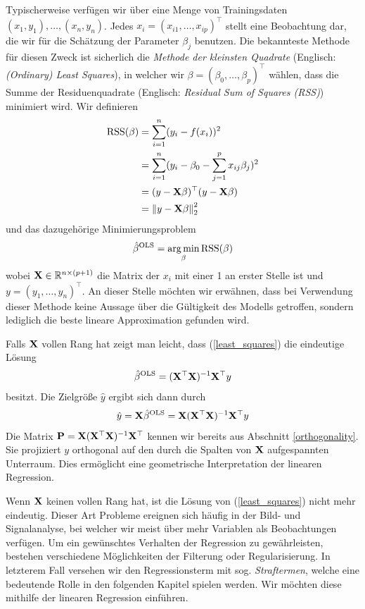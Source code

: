 Typischerweise verfügen wir über eine Menge von Trainingsdaten $(x_1, y_1), \ldots, (x_n, y_n)$. Jedes $x_i = (x_{i1}, \ldots, x_{ip})^{\top}$ stellt eine Beobachtung dar, die wir für die Schätzung der Parameter $\beta_j$ benutzen. Die bekannteste Methode für diesen Zweck ist sicherlich die \textit{Methode der kleinsten Quadrate} (Englisch: \textit{(Ordinary) Least Squares}), in welcher wir $\beta = (\beta_0, \ldots, \beta_p)^{\top}$ wählen, dass die Summe der Residuenquadrate (Englisch: \textit{Residual Sum of Squares (RSS)}) minimiert wird. Wir definieren
\begin{align}
\label{RSS}
\text{RSS}(\beta) & = \sum_{i=1}^{n}(y_i - f(x_i))^2\\
& = \sum_{i=1}^{n}(y_i - \beta_0 - \sum_{j=1}^p x_{ij}\beta_j)^2\nonumber\\
& = (y - \mathbf{X} \beta)^{\top}(y-\mathbf{X} \beta)\nonumber\\
& = \left\lVert y - \mathbf{X} \beta \right\rVert_{2}^{2}\nonumber
\end{align}
und das dazugehörige Minimierungsproblem
\begin{align}
\label{least_squares}
\hat{\beta}^{\text{OLS}} = \operatorname*{arg\,min}_{\beta} \text{RSS}(\beta)
\end{align}
wobei $\mathbf{X} \in \mathbb{R}^{n \times (p+1)}$ die Matrix der $x_i$ mit einer 1 an erster Stelle ist und $y = (y_1, \ldots, y_n)^{\top}$. An dieser Stelle möchten wir erwähnen, dass bei Verwendung dieser Methode keine Aussage über die Gültigkeit des Modells getroffen, sondern lediglich die beste lineare Approximation gefunden wird.

Falls $\mathbf{X}$ vollen Rang hat zeigt man leicht, dass (\ref{least_squares}) die eindeutige Lösung
\begin{align}
\hat{\beta}^{\text{OLS}} = (\mathbf{X}^{\top}\mathbf{X})^{-1}\mathbf{X}^{\top} y
\end{align}
besitzt. Die Zielgröße $\hat{y}$ ergibt sich dann durch
\begin{align}
\hat{y} = \mathbf{X} \hat{\beta}^{\text{OLS}} = \mathbf{X} (\mathbf{X}^{\top}\mathbf{X})^{-1}\mathbf{X}^{\top} y
\end{align}
Die Matrix $\mathbf{P} = \mathbf{X} (\mathbf{X}^{\top}\mathbf{X})^{-1}\mathbf{X}^{\top}$ kennen wir bereits aus Abschnitt \ref{orthogonality}. Sie projiziert $y$ orthogonal auf den durch die Spalten von $\mathbf{X}$ aufgespannten Unterraum. Dies ermöglicht eine geometrische Interpretation der linearen Regression.

Wenn $\mathbf{X}$ keinen vollen Rang hat, ist die Lösung von (\ref{least_squares}) nicht mehr eindeutig. Dieser Art Probleme ereignen sich häufig in der Bild- und Signalanalyse, bei welcher wir meist über mehr Variablen als Beobachtungen verfügen. Um ein gewünschtes Verhalten der Regression zu gewährleisten, bestehen verschiedene Möglichkeiten der Filterung oder Regularisierung. In letzterem Fall versehen wir den Regressionsterm mit sog. \textit{Straftermen}, welche eine bedeutende Rolle in den folgenden Kapitel spielen werden. Wir möchten diese mithilfe der linearen Regression einführen.

